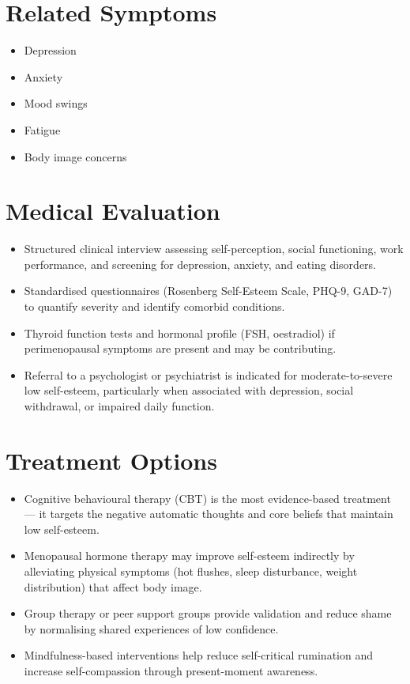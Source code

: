 \section*{Related Symptoms}
\begin{itemize}
  \item Depression
  \item Anxiety
  \item Mood swings
  \item Fatigue
  \item Body image concerns
\end{itemize}


\section*{Medical Evaluation}
\begin{itemize}
  \item Structured clinical interview assessing self-perception, social functioning, work performance, and screening for depression, anxiety, and eating disorders.
  \item Standardised questionnaires (Rosenberg Self-Esteem Scale, PHQ-9, GAD-7) to quantify severity and identify comorbid conditions.
  \item Thyroid function tests and hormonal profile (FSH, oestradiol) if perimenopausal symptoms are present and may be contributing.
  \item Referral to a psychologist or psychiatrist is indicated for moderate-to-severe low self-esteem, particularly when associated with depression, social withdrawal, or impaired daily function.
\end{itemize}

\section*{Treatment Options}
\begin{itemize}
  \item Cognitive behavioural therapy (CBT) is the most evidence-based treatment — it targets the negative automatic thoughts and core beliefs that maintain low self-esteem.
  \item Menopausal hormone therapy may improve self-esteem indirectly by alleviating physical symptoms (hot flushes, sleep disturbance, weight distribution) that affect body image.
  \item Group therapy or peer support groups provide validation and reduce shame by normalising shared experiences of low confidence.
  \item Mindfulness-based interventions help reduce self-critical rumination and increase self-compassion through present-moment awareness.
\end{itemize}

